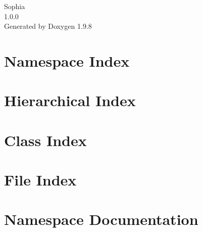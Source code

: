 \documentclass[twoside]{book}
\newcommand{\+}{\discretionary{\mbox{\scriptsize$\hookleftarrow$}}{}{}}
\newcommand{\clearemptydoublepage}{%
    \newpage{\pagestyle{empty}\cleardoublepage}%
  }
\begin{document}
  \raggedbottom
    \hypersetup{pageanchor=false,
                bookmarksnumbered=true,
                pdfencoding=unicode
               }
  \begin{titlepage}
  \vspace*{7cm}
  \begin{center}%
  {\Large Sophia}\\
  [1ex]\large 1.\+0.\+0 \\
  \vspace*{1cm}
  {\large Generated by Doxygen 1.9.8}\\
  \end{center}
  \end{titlepage}
  \clearemptydoublepage
  \tableofcontents
  \clearemptydoublepage
  \hypersetup{pageanchor=true}


\chapter{Namespace Index}

\chapter{Hierarchical Index}

\chapter{Class Index}

\chapter{File Index}

\chapter{Namespace Documentation}













\end{document}

